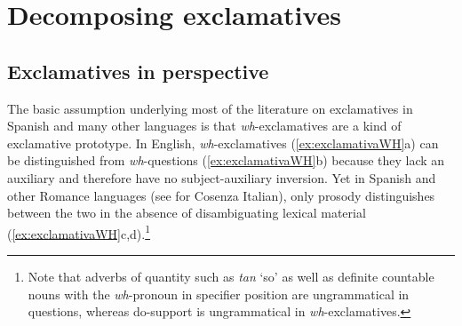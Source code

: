 	
	
	

\section{Decomposing exclamatives}
\label{ch:3.1}

\subsection{Exclamatives in perspective}
\label{ch:3.1.1}

The basic assumption underlying most of the literature on exclamatives in 
Spanish and many other languages is that \textit{wh}-exclamatives are a kind of 
exclamative prototype. In English, \textit{wh}-exclamatives 
(\ref{ex:exclamativaWH}a) can be distinguished from \textit{wh}-questions (\ref{ex:exclamativaWH}b) because they lack an auxi\-liary and therefore have no sub\-ject-auxi\-liary inversion. Yet in Spanish and other Romance languages 
(see \cite{KellertETAL.2018} for Cosenza Italian), only prosody 
distinguishes between the two in the absence of disambiguating lexical 
material (\ref{ex:exclamativaWH}c,d).\footnote{Note that adverbs of 
quantity such as \textit{tan} `so' as well as 
definite countable nouns with the \textit{wh}-pronoun in specifier position are 
ungrammatical in questions, whereas do-support is ungrammatical in \textit{wh}-exclamatives.}

